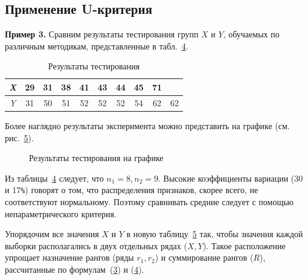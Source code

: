 \documentclass[12pt]{article}
\begin{document}
\medskip
\subsection{Применение U-критерия}

\medskip
\textbf{Пример 3.} Сравним результаты тестирования групп $X$ и $Y$, обучаемых по различным методикам, представленные в табл.~\hyperref[tbl:test-results]{4}. 

\begin{table}[h]
    \label{tbl:test-results}
    \centering
    \caption{Результаты тестирования}
    \bigskip
    \begin{tabular}{|c|c|c|c|c|c|c|c|c|c|} \hline
         \textit{X} &29&31&38&41&43&44&45&71&  \\ \hline
         \textit{Y} &31&50&51&52&52&52&54&62&62  \\  \hline
    \end{tabular}
\end{table}
Более наглядно результаты эксперимента можно представить на графике (см. рис.~\hyperref[fgr:test-results]{5}).

\begin{figure}[htbp]
    \label{fgr:test-results}
    \centering
    \caption{Результаты тестирования на графике}
\end{figure}

 
Из таблицы~\hyperref[tbl:test-results]{4} следует, что $n_1 = 8, n_2 = 9$. Высокие коэффициенты вариации (30 и 17\verb!%!) говорят о том, что распределения признаков, скорее всего, не соответствуют нормальному. Поэтому сравнивать средние следует с помощью непараметрического критерия.

Упорядочим все значения $X$ и $Y$ в новую таблицу~\hyperref[tbl:test-results-racked]{5} так, чтобы значения каждой выборки располагались в двух отдельных рядах ($X, Y$). Такое расположение упрощает назначение рангов (ряды $r_1, r_2$) и суммирование рангов ($R$), рассчитанные по формулам~(\hyperref[eq:r-1]{3}) и (\hyperref[eq:r-2]{4}).
\end{document}
